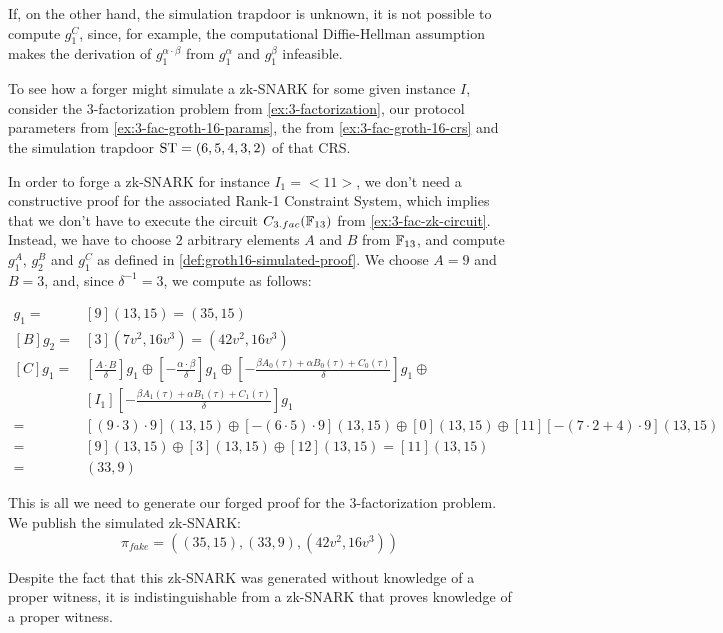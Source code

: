 If, on the other hand, the simulation trapdoor is unknown, it is not possible to compute $g_1^C$, since, for example, the computational Diffie-Hellman assumption makes the derivation of $g_1^{\alpha\cdot \beta}$ from $g_1^\alpha$ and $g_1^\beta$ infeasible.

\begin{example}
\label{3-fac-snark-simulator}
To see how a forger might simulate a zk-SNARK for some given instance $I$, consider the $3$-factorization problem from  \examplename{} \ref{ex:3-factorization}, our protocol parameters from \eqref{ex:3-fac-groth-16-params}, the  from \examplename{} \ref{ex:3-fac-groth-16-crs} and the simulation trapdoor $\mathrm{ST} = (6,5,4,3,2)$ of that CRS.

In order to forge a zk-SNARK for instance $I_1=<11>$, we don't need a constructive proof for the associated Rank-1 Constraint System, which implies that we don't have to execute the circuit $C_{3.fac}(\mathbb{F}_{13})$ from \examplename{} \ref{ex:3-fac-zk-circuit}. Instead, we have to choose $2$ arbitrary elements $A$ and $B$ from $\mathbb{F}_{13}$, and compute $g_1^A$, $g_2^B$ and $g_1^C$ as defined in \ref{def:groth16-simulated-proof}. We choose $A=9$ and $B=3$, and, since $\delta^{-1}=3$, we compute as follows:

\begin{align*}
[A]g_1 =& [9](13,15) = (35,15)\\
[B]g_2 =& [3](7v^2,16v^3) = (42v^2,16v^3)\\
[C]g_1 =& [\frac{A\cdot B}{\delta}]g_1\oplus 
           [-\frac{\alpha\cdot\beta}{\delta}]g_1\oplus 
      [-\frac{\beta A_0(\tau) + \alpha B_0(\tau)+ C_0(\tau)}{\delta}]g_1\oplus\\
      &[I_1][-\frac{\beta A_1(\tau) + \alpha B_1(\tau)+ C_1(\tau)}{\delta}]g_1\\      
     = & [(9\cdot 3)\cdot 9 ](13,15)\oplus 
      [-(6\cdot 5)\cdot 9](13,15)\oplus 
      [0](13,15)\oplus 
      [11][-(7\cdot 2 + 4)\cdot 9](13,15)\\      
     = &[9](13,15)\oplus [3](13,15)\oplus [12](13,15)= [11](13,15)\\       
     = &(33,9)
\end{align*}

This is all we need to generate our forged proof for the $3$-factorization problem. We publish the simulated zk-SNARK:
$$
\pi_{fake}=((35,15),(33,9),(42v^2,16v^3))
$$

Despite the fact that this zk-SNARK was generated without knowledge of a proper witness, it is indistinguishable from a zk-SNARK that proves knowledge of a proper witness. 


\end{example}
